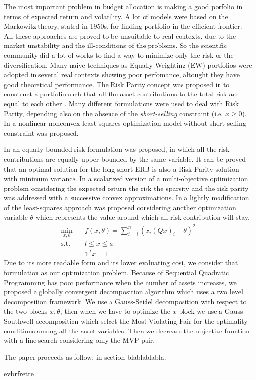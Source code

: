 The most important problem in budget allocation is making a good porfolio in terms of expected return and volatility. 
A lot of models were based on the Markowitz theory, stated in 1950s, for finding portfolio in the efficient frontier. 
All these approaches are proved to be unsuitable to real contexts, due to the market unstability and the ill-conditions of the problems. 
So the scientific community did a lot of works to find a way to minimize only the risk or the diversification. 
Many naive techniques as Equally Weighting (EW) portfolios were adopted in several real contexts showing poor perfomance, altought they have good theoretical performance. 
The Risk Parity concept was proposed in \cite{qian2005} to construct a portfolio such that all the asset contributions to the total risk are equal to each other \cite{maillard}.
Many different formulations were used to deal with Risk Parity, depending also on the absence of the \emph{short-selling} constraint (i.e. $x\ge0$).
In \cite{maillard} a nonlinear nonconvex least-squares optimization model without short-selling constraint was proposed.

In \cite{tardella2016} an equally bounded risk formulation was proposed, in which all the risk contributions are equally upper bounded by the same variable. It can be proved that an optimal solution for the long-short ERB is also a Risk Parity solution with minimum variance.
In \cite{feng2016} a scalarized version of a multi-objective optimization problem considering the expected return the risk the sparsity and the risk parity was addressed with a successive convex approximations.
In \cite{tutuncu} a lightly modification of the least-squares approach was proposed considering another optimization variable $\theta$ which represents the value around which all risk contribution will stay.
\begin{subequations}\label{eq:problemRP} 
\begin{align}
\min_{x,\theta} & \quad f(x,\theta) =  \sum_{i=i}^n \left(x_i(Q x)_i - \theta\right)^2 \\
\text{s.t.} & \quad l \leq x \leq u \\
& \quad \mathds{1}^T x = 1 
\end{align}
\end{subequations}
Due to its more readable form and its lower evaluating cost, we consider that formulation as our optimization problem.
Because of Sequential Quadratic Programming has poor performance when the number of assets increases, we proposed a globally convergent decomposition algorithm which uses a two level decomposition framework.
We use a Gauss-Seidel decomposition with respect to the two blocks $x,\theta$, then when we have to optimize the $x$ block we use a Gauss-Southwell decomposition which select the Most Violating Pair for the optimality conditions among all the asset variables. Then we decrease the objective function with a line search considering only the MVP pair.

The paper proceeds as follow: in section blablablabla.


\begin{proposition}
evbrfretre
\end{proposition}